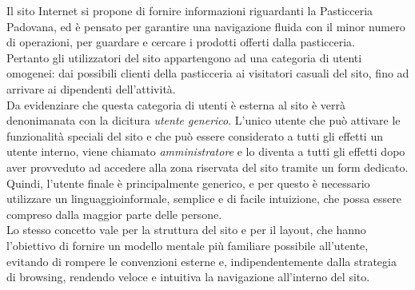 Il sito Internet si propone di fornire informazioni riguardanti la Pasticceria Padovana, ed è pensato per garantire una navigazione fluida con il minor numero di operazioni, per guardare e cercare i prodotti offerti dalla pasticceria.\\
Pertanto gli utilizzatori del sito appartengono ad una categoria di utenti omogenei: dai possibili clienti della pasticceria ai visitatori casuali del sito, fino ad arrivare ai dipendenti dell'attività.\\
Da evidenziare che questa categoria di utenti è esterna al sito è verrà denonimanata con la dicitura \emph{utente generico}.
L'unico utente che può attivare le funzionalità speciali del sito e che può essere considerato a tutti gli effetti un utente interno, viene chiamato \emph{amministratore} e lo diventa a tutti gli effetti dopo aver provveduto ad accedere alla zona riservata del sito tramite un form dedicato.\\
Quindi, l'utente finale è principalmente generico, e per questo è necessario utilizzare un linguaggioinformale, semplice e di facile intuizione, che possa essere compreso dalla maggior parte delle persone.\\ 
Lo stesso concetto vale per la struttura del sito e per il layout, che hanno l'obiettivo di fornire un modello mentale più familiare possibile all'utente, evitando di rompere le convenzioni esterne e, indipendentemente dalla strategia di browsing, rendendo veloce e intuitiva la navigazione all'interno del sito.\\
